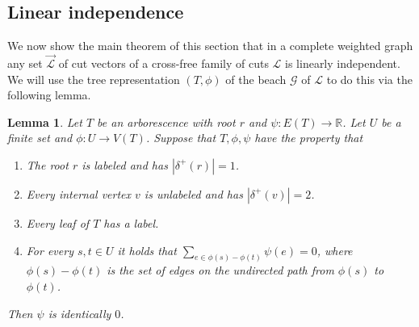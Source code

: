 \documentclass[10pt,a4paper]{article}
\newcommand{\R}{\mathbb{R}}
\newcommand{\Lcal}{\mathcal{L}}
\newcommand{\Gcal}{\mathcal{G}}
\newcommand{\1}{\mathbf{1}}
\newtheorem{lemma}[theorem]{Lemma}
\theoremstyle{definition}
\begin{document}
\subsection{Linear independence}
We now show the main theorem of this section that in a complete weighted graph any set $\vec{\Lcal}$ of cut vectors of a cross-free family of cuts $\Lcal$ is linearly independent.
We will use the tree representation $(T,\phi)$ of the beach $\Gcal$ of $\Lcal$ to do this via the following lemma.
\begin{lemma}
\label{lem:tree_assign}
Let $T$ be an arborescence with root $r$ and $\psi : E(T) \rightarrow \R$.   Let $U$ be a finite set and $\phi: U \rightarrow V(T)$.  Suppose that $T,\phi, \psi$ have the property
that
\begin{enumerate}
  \item The root $r$ is labeled and has $|\delta^+(r)| = 1$.
  \item Every internal vertex $v$ is unlabeled and has $|\delta^+(v)| = 2$.
  \item Every leaf of $T$ has a label.
  \item For every $s,t \in U$ it holds that $\sum_{e \in \phi(s)-\phi(t)} \psi(e) = 0$, where $\phi(s)-\phi(t)$ is the set of edges on the undirected path from $\phi(s)$ to $\phi(t)$.
\end{enumerate}
Then $\psi$ is identically $0$.
\end{lemma}
\end{document}
